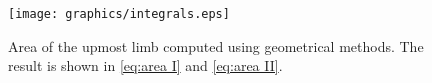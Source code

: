 \begin{figure}
   \centering
   \texttt{[image: graphics/integrals.eps]}  \\
   \caption{Area of the upmost limb computed using geometrical methods. The result is shown in \eqref{eq:area I} and \eqref{eq:area II}.}
   \label{fig:sector integrals}
\end{figure}

\endinput  %